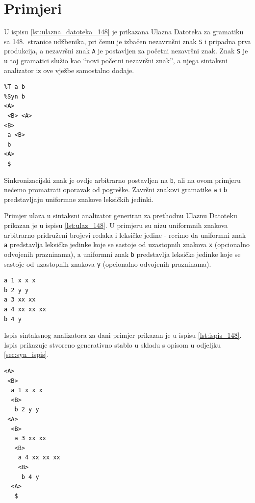 \documentclass[times, 12pt, utf8]{book}
\begin{document}
\section{Primjeri}
U ispisu \ref{lst:ulazna_datoteka_148} je prikazana Ulazna Datoteka za gramatiku sa 148.~stranice udžbenika, pri čemu je izbačen nezavrnšni znak \texttt{S} i pripadna prva produkcija, a nezavršni znak \texttt{A} je postavljen za početni nezavršni znak.
Znak \texttt{S} je u toj gramatici služio kao ``novi početni nezavršni znak'', a njega sintaksni analizator iz ove vježbe samostalno dodaje.

\begin{lstlisting}[caption={Ulazna Datoteka za gramatiku sa 148.~stranice udžbenika.},label=lst:ulazna_datoteka_148]
%V <A> <B>
%T a b
%Syn b
<A>
 <B> <A>
<B>
 a <B>
 b
<A>
 $

\end{lstlisting}

Sinkronizacijski znak je ovdje arbitrarno postavljen na \verb|b|, ali na ovom primjeru nećemo promatrati oporavak od pogreške.
Završni znakovi gramatike \verb|a| i \verb|b| predstavljaju uniformne znakove leksičkih jedinki.

Primjer ulaza u sintaksni analizator generiran za prethodnu Ulaznu Datoteku prikazan je u ispisu \ref{lst:ulaz_148}.
U primjeru su nizu uniformnih znakova arbitrarno pridruženi brojevi redaka i leksičke jedine - recimo da uniformni znak \verb|a| predstavlja leksičke jedinke koje se sastoje od uzastopnih znakova \verb|x| (opcionalno odvojenih prazninama), a uniformni znak \verb|b| predstavlja leksičke jedinke koje se sastoje od uzastopnih znakova \verb|y| (opcionalno odvojenih prazninama).

\begin{lstlisting}[caption={Ulaz u analizator za gramatiku sa 148.~stranice udžbenika.},label=lst:ulaz_148]
a 1 x x x
b 2 y y
a 3 xx xx
a 4 xx xx xx
b 4 y

\end{lstlisting}

Ispis sintaksnog analizatora za dani primjer prikazan je u ispisu \ref{lst:ispis_148}.
Ispis prikazuje stvoreno generativno stablo u skladu s opisom u odjeljku \ref{sec:syn_ispis}.

\begin{lstlisting}[caption={Ispis analizatora za gramatiku sa 148.~stranice udžbenika i ulaz is ispisa \ref{lst:ulaz_148}.},label=lst:ispis_148]
<A>
 <B>
  a 1 x x x
  <B>
   b 2 y y
 <A>
  <B>
   a 3 xx xx
   <B>
    a 4 xx xx xx
    <B>
     b 4 y
  <A>
   $

\end{lstlisting}
\end{document}
